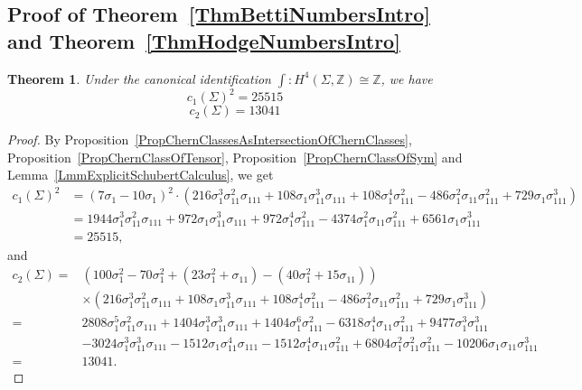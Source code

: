 \documentclass{article}
\newtheorem{theorem}{Theorem}[section]
\theoremstyle{definition}
\begin{document}
\subsection{Proof of Theorem~\ref{ThmBettiNumbersIntro} and Theorem~\ref{ThmHodgeNumbersIntro}}

\begin{theorem}\label{ThmChernClassesAsNumbers}
Under the canonical identification $\int: H^4(\Sigma, \mathbb Z)\cong \mathbb Z$, we have
\[
c_1{(\Sigma)}^2 = 25515
\]
\[
c_2{(\Sigma)} = 13041
\]
\end{theorem}

\begin{proof}
By Proposition~\ref{PropChernClassesAsIntersectionOfChernClasses}, Proposition~\ref{PropChernClassOfTensor}, Proposition~\ref{PropChernClassOfSym} and Lemma~\ref{LmmExplicitSchubertCalculus}, we get
\begin{align*}
c_1{(\Sigma)}^2 &= (7\sigma_1 - 10\sigma_1)^2 \cdot \left(216 \sigma_1^3 \sigma_{11}^2 \sigma_{111} + 108 \sigma_1 \sigma_{11}^3 \sigma_{111} + 108 \sigma_1^4 \sigma_{111}^2 - 486 \sigma_1^2 \sigma_{11} \sigma_{111}^2 + 729 \sigma_1 \sigma_{111}^3\right) \\
&= 1944 \sigma_1^3 \sigma_{11}^2 \sigma_{111} + 972 \sigma_1 \sigma_{11}^3 \sigma_{111} + 972 \sigma_1^4 \sigma_{111}^2 - 4374 \sigma_1^2 \sigma_{11} \sigma_{111}^2 + 6561 \sigma_1 \sigma_{111}^3
\\&= 25515,
\end{align*}
and 
\begin{align*}
c_2(\Sigma) = & (100 \sigma_1^2 - 70 \sigma_1^2 + (23 \sigma_1^2 + \sigma_{11}) - (40 \sigma_1^2 + 15 \sigma_{11}))\\
& \times \left(216 \sigma_1^3 \sigma_{11}^2 \sigma_{111} + 108 \sigma_1 \sigma_{11}^3 \sigma_{111} + 108 \sigma_1^4 \sigma_{111}^2 - 486 \sigma_1^2 \sigma_{11} \sigma_{111}^2 + 729 \sigma_1 \sigma_{111}^3 \right) \\
= & 2808 \sigma_1^5 \sigma_{11}^2 \sigma_{111} + 1404 \sigma_1^3 \sigma_{11}^3 \sigma_{111} + 1404 \sigma_1^6 \sigma_{111}^2 - 6318 \sigma_1^4 \sigma_{11} \sigma_{111}^2 + 9477 \sigma_1^3 \sigma_{111}^3 \\
&- 3024 \sigma_1^3 \sigma_{11}^3 \sigma_{111} - 1512 \sigma_1 \sigma_{11}^4 \sigma_{111} - 1512 \sigma_1^4 \sigma_{11} \sigma_{111}^2 + 6804 \sigma_1^2 \sigma_{11}^2 \sigma_{111}^2 - 10206 \sigma_1 \sigma_{11} \sigma_{111}^3 \\
= & 13041.
\end{align*}
\end{proof}
\end{document}

